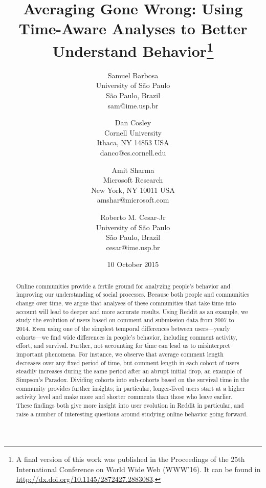 \documentclass[10pt, oneside, onecolumn]{article}
\begin{document}
\title{Averaging Gone Wrong: Using Time-Aware Analyses to Better Understand Behavior\footnote{A final version of this work was published in the Proceedings of the 25th International Conference on World Wide Web (WWW'16). It can be found in \url{http://dx.doi.org/10.1145/2872427.2883083}.}}

\author{
Samuel Barbosa\\
University of S\~ao Paulo\\
S\~ao Paulo, Brazil\\
sam@ime.usp.br
\and
Dan Cosley\\
Cornell University\\
Ithaca, NY 14853 USA\\
danco@cs.cornell.edu
\and
Amit Sharma\\
Microsoft Research\\
New York, NY 10011 USA\\
amshar@microsoft.com
\and
Roberto M. Cesar-Jr\\
University of S\~ao Paulo\\
S\~ao Paulo, Brazil\\
cesar@ime.usp.br
}

\date{10 October 2015}

\maketitle
\begin{abstract}
Online communities provide a fertile ground for analyzing people's behavior and improving our understanding of social processes.  Because both people and communities change over time, we argue that analyses of these communities that take time into account will lead to deeper and more accurate results.  Using Reddit as an example, we study the evolution of users based on comment and submission data from 2007 to 2014. Even using one of the simplest temporal differences between users---yearly cohorts---we find wide differences in people's behavior, including comment activity, effort, and survival.  Further, not accounting for time can lead us to misinterpret important phenomena.  For instance, we observe that average comment length decreases over any fixed period of time, but comment length in each cohort of users steadily increases during the same period after an abrupt initial drop, an example of Simpson's Paradox.  Dividing cohorts into sub-cohorts based on the survival time in the community provides further insights; in particular, longer-lived users start at a higher activity level and make more and shorter comments than those who leave earlier.  These findings both give more insight into user evolution in Reddit in particular, and raise a number of interesting questions around studying online behavior going forward.
\end{abstract}
\end{document}
